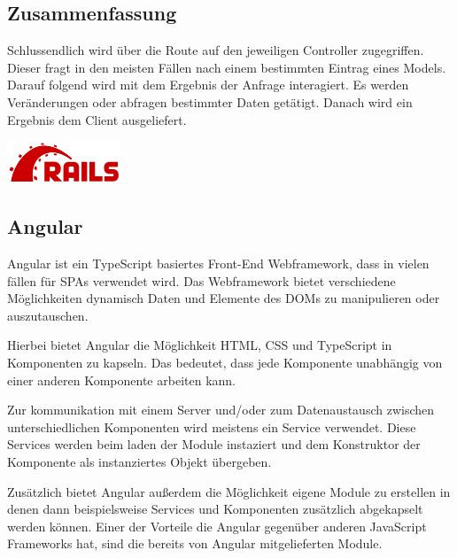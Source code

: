 \documentclass[11pt]{article}
\begin{document}
\begin{flushleft}
			\subsection{Zusammenfassung}
			\label{sec: rails_resuemee}
			Schlussendlich wird über die Route auf den jeweiligen Controller zugegriffen. Dieser fragt in den meisten Fällen nach einem bestimmten Eintrag eines Models. Darauf folgend wird mit dem Ergebnis der Anfrage interagiert. Es werden Veränderungen oder abfragen bestimmter Daten getätigt. Danach wird ein Ergebnis dem Client ausgeliefert.
			
			
			
			
			
			
			\begin{center}
				\includegraphics[scale=0.4]{rails.png}
			\end{center}
			
			\subsection{Angular}
			\label{sec: angular}
			Angular ist ein TypeScript basiertes Front-End Webframework, dass in vielen fällen für SPAs verwendet wird. Das Webframework bietet verschiedene Möglichkeiten dynamisch Daten und Elemente des DOMs zu manipulieren oder auszutauschen.\par\bigskip 
			
			Hierbei bietet Angular die Möglichkeit HTML, CSS und TypeScript in Komponenten zu kapseln. Das bedeutet, dass jede Komponente unabhängig von einer anderen Komponente arbeiten kann.\par\bigskip
			
			Zur kommunikation mit einem Server und/oder zum Datenaustausch zwischen unterschiedlichen Komponenten wird meistens ein Service verwendet. Diese Services werden beim laden der Module instaziert und dem Konstruktor der Komponente als instanziertes Objekt übergeben.\par\bigskip
			
			Zusätzlich bietet Angular außerdem die Möglichkeit eigene Module zu erstellen in denen dann beispielsweise Services und Komponenten zusätzlich abgekapselt werden können. Einer der Vorteile die Angular gegenüber anderen JavaScript Frameworks hat, sind die bereits von Angular mitgelieferten Module. 
			

\end{flushleft}
\end{document}
